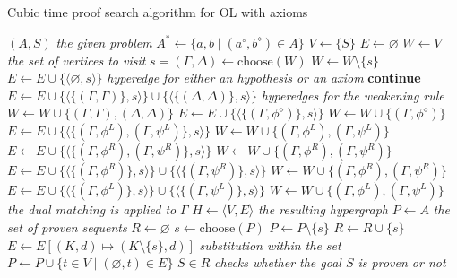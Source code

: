 \documentclass[a4paper, 11pt]{article}
\begin{document}
    \begin{algorithm}
	    \caption{Cubic time proof search algorithm for OL with axioms}
	    \label{proof_search_algo}
    \begin{algorithmic}
	    \State $(A,S)$ \textit{the given problem}
	    \State $A^*\gets\{a,b\mid(a^\circ,b^\diamond)\in A\}$
	    \State $V\gets \{S\}$	
	    \State $E\gets\varnothing$
	    \State $W\gets V$ \textit{the set of vertices to visit}   
	    \State $s=(\Gamma,\Delta)\gets\text{choose}(W)$
	    \State $W\gets W\setminus\{s\}$
	    \State $E\gets E\cup\{\langle\varnothing,s\rangle\}$ 
	    \textit{hyperedge for either an hypothesis or an axiom}
	    \State\textbf{continue}
	    \EndIf
	    \State $E\gets E\cup\{\langle\{(\Gamma,\Gamma)\},s\rangle\}\cup
	    \{\langle\{(\Delta,\Delta)\},s\rangle\}$ \textit{hyperedges for the weakening rule}
	    \State $W\gets W\cup\{(\Gamma,\Gamma),(\Delta,\Delta)\}$
	    \If {$\Delta=\neg\phi^\diamond$}
	    \State $E\gets E\cup\{\langle\{(\Gamma,\phi^\diamond)\},s\rangle\}$
	    \State $W\gets W\cup\{(\Gamma,\phi^\diamond)\}$
	    \State $E\gets E\cup\{\langle\{(\Gamma,\phi^L),(\Gamma,\psi^L)\},s\rangle\}$
	    \State $W\gets W\cup\{(\Gamma,\phi^L),(\Gamma,\psi^L)\}$
	    \State $E\gets E\cup\{\langle\{(\Gamma,\phi^R),(\Gamma,\psi^R)\},s\rangle\}$
	    \State $W\gets W\cup\{(\Gamma,\phi^R),(\Gamma,\psi^R)\}$
	    \State $E\gets E\cup\{\langle\{(\Gamma,\phi^R)\},s\rangle\}\cup
	    \{\langle\{(\Gamma,\psi^R)\},s\rangle\}$
	    \State $W\gets W\cup\{(\Gamma,\phi^R),(\Gamma,\psi^R)\}$ 
	    \State $E\gets E\cup\{\langle\{(\Gamma,\phi^L)\},s\rangle\}\cup
	    \{\langle\{(\Gamma,\psi^L)\},s\rangle\}$
	    \State $W\gets W\cup\{(\Gamma,\phi^L),(\Gamma,\psi^L)\}$
	    \EndIf
	    \State \textit{the dual matching is applied to }$\Gamma$ 
	    \EndWhile
	    \State $H\gets\langle V,E\rangle$ \textit{the resulting hypergraph}
	    \State $P\gets A$ \textit{the set of proven sequents}
	    \State $R\gets \varnothing$
	    \State $s\gets \text{choose}(P)$
	    \State $P\gets P\setminus\{s\}$
	    \State $R\gets R\cup\{s\}$
	    \State $E\gets E[(K,d)\mapsto (K\setminus\{s\},d)]$ \textit{substitution within the set}
	    \State $P\gets P\cup\{t\in V\mid(\varnothing,t)\in E\}$  
	    \EndWhile
	    \State \Return $S\in R$ \textit{checks whether the goal $S$ is proven or not}
    \end{algorithmic}
    \end{algorithm}
\end{document}

